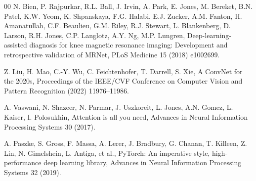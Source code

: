 \documentclass[preprint,12pt]{elsarticle}
\begin{document}
\begin{thebibliography}{00}
N. Bien, P. Rajpurkar, R.L. Ball, J. Irvin, A. Park, E. Jones, M. Bereket, B.N. Patel, K.W. Yeom, K. Shpanskaya, F.G. Halabi, E.J. Zucker, A.M. Fanton, H. Amanatullah, C.F. Beaulieu, G.M. Riley, R.J. Stewart, L. Blankenberg, D. Larson, R.H. Jones, C.P. Langlotz, A.Y. Ng, M.P. Lungren,
Deep-learning-assisted diagnosis for knee magnetic resonance imaging: Development and retrospective validation of MRNet,
PLoS Medicine 15 (2018) e1002699.

Z. Liu, H. Mao, C.-Y. Wu, C. Feichtenhofer, T. Darrell, S. Xie,
A ConvNet for the 2020s,
Proceedings of the IEEE/CVF Conference on Computer Vision and Pattern Recognition (2022) 11976--11986.

A. Vaswani, N. Shazeer, N. Parmar, J. Uszkoreit, L. Jones, A.N. Gomez, L. Kaiser, I. Polosukhin,
Attention is all you need,
Advances in Neural Information Processing Systems 30 (2017).

A. Paszke, S. Gross, F. Massa, A. Lerer, J. Bradbury, G. Chanan, T. Killeen, Z. Lin, N. Gimelshein, L. Antiga, et al.,
PyTorch: An imperative style, high-performance deep learning library,
Advances in Neural Information Processing Systems 32 (2019).
\end{thebibliography}
\end{document}
